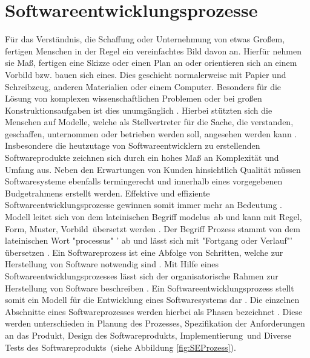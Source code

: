 \section{Softwareentwicklungsprozesse}\label{sec:chapter.2: Softwareentwicklungsprozesse}

Für das Verständnis, die Schaffung oder Unternehmung von etwas Großem, fertigen Menschen in der Regel ein vereinfachtes Bild davon an. Hierfür nehmen sie Maß, fertigen eine Skizze oder einen Plan an oder orientieren sich an einem Vorbild bzw. bauen sich eines. Dies geschieht normalerweise mit Papier und Schreibzeug, anderen Materialien oder einem Computer. Besonders für die Lösung von komplexen wissenschaftlichen Problemen oder bei großen Konstruktionsaufgaben ist dies unumgänglich \cite{Hesse2008}. \newline
Hierbei stützten sich die Menschen auf Modelle, welche als Stellvertreter für die Sache, die verstanden, geschaffen, unternommen oder betrieben werden soll, angesehen werden kann \cite{Hesse2008}. \newline
Insbesondere die heutzutage von Softwareentwicklern zu erstellenden Softwareprodukte zeichnen sich durch ein hohes Maß an Komplexität und Umfang aus. Neben den Erwartungen von Kunden hinsichtlich Qualität müssen Softwaresysteme ebenfalls termingerecht und innerhalb eines vorgegebenen Budgetrahmens erstellt werden. Effektive und effiziente Softwareentwicklungsprozesse gewinnen somit immer mehr an Bedeutung \cite{Grechenig2010}.
Modell leitet sich von dem lateinischen Begriff  \glqq modelus\grqq \ 
ab und kann mit  \grqq Regel, Form, Muster, Vorbild\grqq \ übersetzt werden \cite{Hesse2008}. 
Der Begriff Prozess stammt von dem lateinischen Wort "processus" ' ab und lässt sich mit "Fortgang oder Verlauf"' übersetzen \cite{koch2011, Staud2006}. \newline 
Ein Softwareprozess ist eine Abfolge von Schritten, welche zur Herstellung von Software notwendig sind \cite{Mishra2012, Stoerrle2005}. Mit Hilfe eines Softwareentwicklungsprozesses lässt sich der organisatorische Rahmen zur Herstellung von Software beschreiben \cite{Koelmel2000}. Ein Softwareentwicklungsprozess stellt somit ein Modell für die Entwicklung eines Softwaresystems dar \cite{Hanser2010}. Die einzelnen Abschnitte eines Softwareprozesses werden hierbei als Phasen bezeichnet \cite{Stoerrle2005}. Diese werden unterschieden in  \grqq Planung des Prozesses\grqq,  \grqq Spezifikation der Anforderungen an das Produkt\grqq ,  \grqq Design des Softwareprodukts\grqq,  \grqq Implementierung\grqq \ und  \grqq Diverse Tests des Softwareprodukts\grqq \ (siehe Abbildung \ref{fig:SEProzess}).

